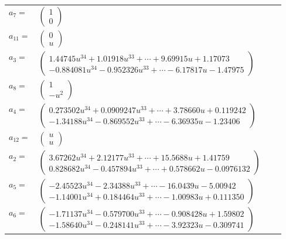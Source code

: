 \documentclass[1p]{elsarticle_modified}
\theoremstyle{definition}
\begin{document}
\begin{tabular}{m{7pt} m{180pt} m{7pt} m{180pt} }
\flushright $a_{7}=$&$\begin{pmatrix}1\\0\end{pmatrix}$ \\
\flushright $a_{11}=$&$\begin{pmatrix}0\\u\end{pmatrix}$ \\
\flushright $a_{3}=$&$\begin{pmatrix}1.44745 u^{34}+1.01918 u^{33}+\cdots+9.69915 u+1.17073\\-0.884081 u^{34}-0.952326 u^{33}+\cdots-6.17817 u-1.47975\end{pmatrix}$ \\
\flushright $a_{8}=$&$\begin{pmatrix}1\\- u^2\end{pmatrix}$ \\
\flushright $a_{4}=$&$\begin{pmatrix}0.273502 u^{34}+0.0909247 u^{33}+\cdots+3.78660 u+0.119242\\-1.34188 u^{34}-0.869552 u^{33}+\cdots-6.36935 u-1.23406\end{pmatrix}$ \\
\flushright $a_{12}=$&$\begin{pmatrix}u\\u\end{pmatrix}$ \\
\flushright $a_{2}=$&$\begin{pmatrix}3.67262 u^{34}+2.12177 u^{33}+\cdots+15.5688 u+1.41759\\0.828682 u^{34}-0.457894 u^{33}+\cdots+0.578662 u-0.0976132\end{pmatrix}$ \\
\flushright $a_{5}=$&$\begin{pmatrix}-2.45523 u^{34}-2.34388 u^{33}+\cdots-16.0439 u-5.00942\\-1.14001 u^{34}+0.184464 u^{33}+\cdots-1.00983 u+0.111350\end{pmatrix}$ \\
\flushright $a_{6}=$&$\begin{pmatrix}-1.71137 u^{34}-0.579700 u^{33}+\cdots-0.908428 u+1.59802\\-1.58640 u^{34}-0.248141 u^{33}+\cdots-3.92323 u-0.309741\end{pmatrix}$ \\

\end{tabular}
\end{document}
